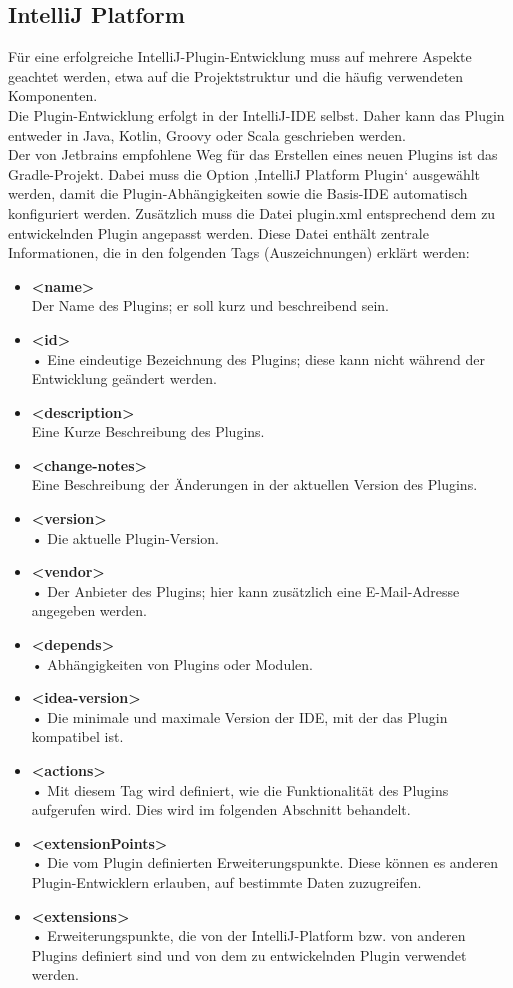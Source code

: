 \subsection{IntelliJ Platform}
	Für eine erfolgreiche IntelliJ-Plugin-Entwicklung muss auf mehrere Aspekte geachtet werden, etwa auf die Projektstruktur und die häufig verwendeten Komponenten. \\
	Die Plugin-Entwicklung erfolgt in der IntelliJ-IDE selbst. Daher kann das Plugin entweder in Java, Kotlin, Groovy oder Scala geschrieben werden.\\
	Der von Jetbrains empfohlene Weg für das Erstellen eines neuen Plugins ist das Gradle-Projekt. Dabei muss die Option ,IntelliJ Platform Plugin‘ ausgewählt werden, damit die Plugin-Abhängigkeiten sowie die Basis-IDE automatisch konfiguriert werden. Zusätzlich muss die Datei plugin.xml entsprechend dem zu entwickelnden Plugin angepasst werden. Diese Datei enthält zentrale Informationen, die in den folgenden Tags (Auszeichnungen) erklärt werden:
	\begin{itemize}
		\item \textbf{<name>} \\
		Der Name des Plugins; er soll kurz und beschreibend sein.
		\item \textbf{<id>} \\    • 
		Eine eindeutige Bezeichnung des Plugins; diese kann nicht während der Entwicklung geändert werden.
		\item \textbf{<description>} \\
		Eine Kurze Beschreibung des Plugins.
		\item \textbf{<change-notes>} \\
		Eine Beschreibung der Änderungen in der aktuellen Version des Plugins.
		\item \textbf{<version>} \\    • 
		Die aktuelle Plugin-Version.
		\item \textbf{<vendor>} \\    • 
		Der Anbieter des Plugins; hier kann zusätzlich eine E-Mail-Adresse angegeben werden.
		\item \textbf{<depends>} \\    • 
		Abhängigkeiten von Plugins oder Modulen.
		\item \textbf{<idea-version>} \\    • 
		Die minimale und maximale Version der IDE, mit der das Plugin kompatibel ist.
		\item \textbf{<actions>} \\    • 
		Mit diesem Tag wird definiert, wie die Funktionalität des Plugins aufgerufen wird. Dies wird im folgenden Abschnitt behandelt.
		\item \textbf{<extensionPoints>} \\    • 
		Die vom Plugin definierten Erweiterungspunkte. Diese können es anderen Plugin-Entwicklern erlauben, auf bestimmte Daten zuzugreifen.
		\item \textbf{<extensions>} \\    • 
		Erweiterungspunkte, die von der IntelliJ-Platform bzw. von anderen Plugins definiert sind und von dem zu entwickelnden Plugin verwendet werden.
	\end{itemize}
